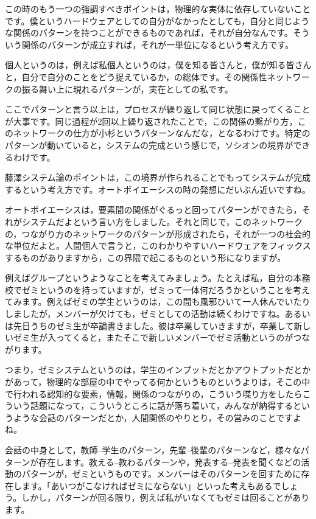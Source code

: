 \documentclass{ltjsbook}
\begin{document}
この時のもう一つの強調すべきポイントは，物理的な実体に依存していないことです。僕というハードウェアとしての自分がなかったとしても，自分と同じような関係のパターンを持つことができるものであれば，それが自分なんです。そういう関係のパターンが成立すれば，それが一単位になるという考え方です。

個人というのは，例えば私個人というのは，僕を知る皆さんと，僕が知る皆さんと，自分で自分のことをどう捉えているか，の総体です。その関係性ネットワークの振る舞い上に現れるパターンが，実在としての私です。

ここでパターンと言う以上は，プロセスが繰り返して同じ状態に戻ってくることが大事です。同じ過程が2回以上繰り返されたことで，この関係の繋がり方，このネットワークの仕方が小杉というパターンなんだな，となるわけです。特定のパターンが動いていると，システムの完成という感じで，ソシオンの境界ができるわけです。

藤澤システム論のポイントは，この境界が作られることでもってシステムが完成するという考え方です。オートポイエーシスの時の発想にだいぶん近いですね。

オートポイエーシスは，要素間の関係がぐるっと回ってパターンができたら，それがシステムだよという言い方をしました。それと同じで，このネットワークの，つながり方のネットワークのパターンが形成されたら，それが一つの社会的な単位だよと。人間個人で言うと，このわかりやすいハードウェアをフィックスするものがありますから，この界隈で起こるものという形になりますが。

例えばグループというようなことを考えてみましょう。たとえば私，自分の本務校でゼミというのを持っていますが，ゼミって一体何だろうかということを考えてみます。例えばゼミの学生というのは，この間も風邪ひいて一人休んでいたりしましたが，メンバーが欠けても，ゼミとしての活動は続くわけですね。あるいは先日うちのゼミ生が卒論書きました。彼は卒業していきますが，卒業して新しいゼミ生が入ってくると，またそこで新しいメンバーでゼミ活動というのがつながります。

つまり，ゼミシステムというのは，学生のインプットだとかアウトプットだとかがあって，物理的な部屋の中でやってる何かというものというよりは，そこの中で行われる認知的な要素，情報，関係のつながりの，こういう喋り方をしたらこういう話題になって，こういうところに話が落ち着いて，みんなが納得するというような会話のパターンだとか，人間関係のやりとり，その営みのことですよね。

会話の中身として，教師--学生のパターン，先輩--後輩のパターンなど，様々なパターンが存在します。教える--教わるパターンや，発表する--発表を聞くなどの活動のパターンが，ゼミというものです。メンバーはそのパターンを回すために存在します。「あいつがこなければゼミにならない」といった考えもあるでしょう。しかし，パターンが回る限り，例えば私がいなくてもゼミは回ることがあります。
\end{document}

